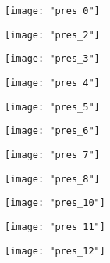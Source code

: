 \setcounter{page}{1}
\begin{figure}[H]
    \centering
    \texttt{[image: "pres\_0"]}
\end{figure}


\newpage
\vfill
\begin{figure}[H]
    \centering
    \texttt{[image: "pres\_2"]}
\end{figure}
\vfill


\newpage
\vfill
\begin{figure}[H]
    \centering
    \texttt{[image: "pres\_3"]}
\end{figure}
\vfill


\newpage
\vfill
\begin{figure}[H]
    \centering
    \texttt{[image: "pres\_4"]}
\end{figure}
\vfill


\newpage
\vfill
\begin{figure}[H]
    \centering
    \texttt{[image: "pres\_5"]}
\end{figure}
\vfill


\newpage
\vfill
\begin{figure}[H]
    \centering
    \texttt{[image: "pres\_6"]}
\end{figure}
\vfill


\newpage
\vfill
\begin{figure}[H]
    \centering
    \texttt{[image: "pres\_7"]}
\end{figure}
\vfill


\newpage
\vfill
\begin{figure}[H]
    \centering
    \texttt{[image: "pres\_8"]}
\end{figure}
\vfill


\newpage
\vfill
\begin{figure}[H]
    \centering
    \texttt{[image: "pres\_10"]}
\end{figure}
\vfill


\newpage
\vfill
\begin{figure}[H]
    \centering
    \texttt{[image: "pres\_11"]}
\end{figure}
\vfill






\newpage
\vfill
\begin{figure}[H]
    \centering
    \texttt{[image: "pres\_12"]}
\end{figure}
\vfill





